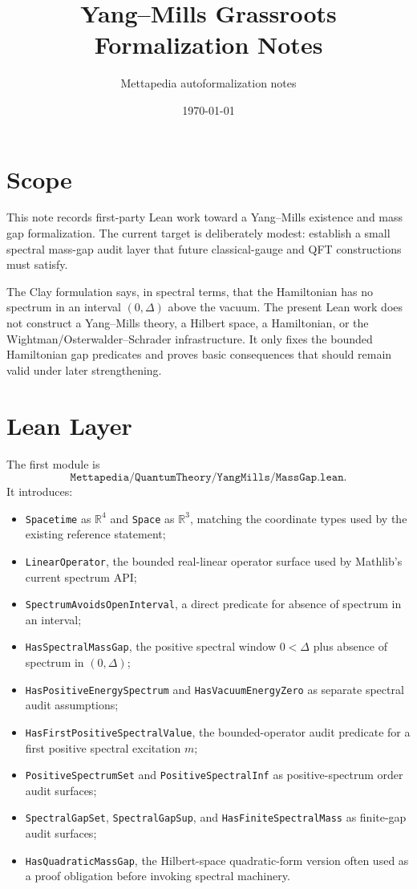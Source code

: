 \documentclass[11pt]{article}
\title{Yang--Mills Grassroots Formalization Notes}
\author{Mettapedia autoformalization notes}
\date{\today}
\newcommand{\lean}[1]{\texttt{#1}}
\begin{document}
\maketitle

\section{Scope}

This note records first-party Lean work toward a Yang--Mills existence and mass
gap formalization.  The current target is deliberately modest: establish a
small spectral mass-gap audit layer that future classical-gauge and QFT
constructions must satisfy.

The Clay formulation says, in spectral terms, that the Hamiltonian has no
spectrum in an interval \((0,\Delta)\) above the vacuum.  The present Lean work
does not construct a Yang--Mills theory, a Hilbert space, a Hamiltonian, or the
Wightman/Osterwalder--Schrader infrastructure.  It only fixes the bounded
Hamiltonian gap predicates and proves basic consequences that should remain
valid under later strengthening.

\section{Lean Layer}

The first module is
\[
  \lean{Mettapedia/QuantumTheory/YangMills/MassGap.lean}.
\]
It introduces:
\begin{itemize}[leftmargin=1.5em]
  \item \lean{Spacetime} as \(\mathbb{R}^4\) and \lean{Space} as
    \(\mathbb{R}^3\), matching the coordinate types used by the existing
    reference statement;
  \item \lean{LinearOperator}, the bounded real-linear operator surface used by
    Mathlib's current spectrum API;
  \item \lean{SpectrumAvoidsOpenInterval}, a direct predicate for absence of
    spectrum in an interval;
  \item \lean{HasSpectralMassGap}, the positive spectral window
    \(0<\Delta\) plus absence of spectrum in \((0,\Delta)\);
  \item \lean{HasPositiveEnergySpectrum} and \lean{HasVacuumEnergyZero} as
    separate spectral audit assumptions;
  \item \lean{HasFirstPositiveSpectralValue}, the bounded-operator audit
    predicate for a first positive spectral excitation \(m\);
  \item \lean{PositiveSpectrumSet} and \lean{PositiveSpectralInf} as
    positive-spectrum order audit surfaces;
  \item \lean{SpectralGapSet}, \lean{SpectralGapSup}, and
    \lean{HasFiniteSpectralMass} as finite-gap audit surfaces;
  \item \lean{HasQuadraticMassGap}, the Hilbert-space quadratic-form version
    often used as a proof obligation before invoking spectral machinery.
\end{itemize}
\end{document}
